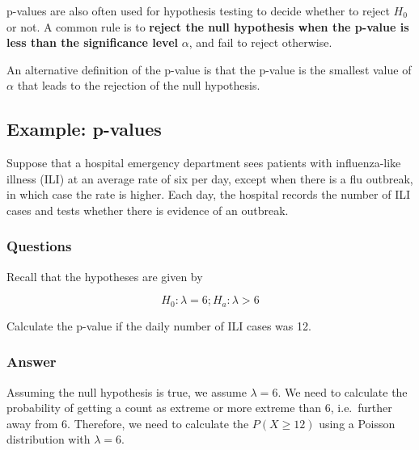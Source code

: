 \documentclass[
  letterpaper,
  DIV=11,
  numbers=noendperiod]{scrartcl}
\begin{document}
\begin{tcolorbox}[enhanced jigsaw, bottomtitle=1mm, colback=white, opacityback=0, leftrule=.75mm, opacitybacktitle=0.6, coltitle=black, left=2mm, colframe=quarto-callout-important-color-frame, toptitle=1mm, colbacktitle=quarto-callout-important-color!10!white, titlerule=0mm, title=\textcolor{quarto-callout-important-color}{\faExclamation}\hspace{0.5em}{Important}, arc=.35mm, rightrule=.15mm, breakable, bottomrule=.15mm, toprule=.15mm]

p-values are also often used for hypothesis testing to decide whether to
reject \(H_0\) or not. A common rule is to \textbf{reject the null
hypothesis when the p-value is less than the significance level}
\(\alpha\), and fail to reject otherwise.

An alternative definition of the p-value is that the p-value is the
smallest value of \(\alpha\) that leads to the rejection of the null
hypothesis.

\end{tcolorbox}

\subsection{Example: p-values}\label{example-p-values}

Suppose that a hospital emergency department sees patients with
influenza-like illness (ILI) at an average rate of six per day, except
when there is a flu outbreak, in which case the rate is higher. Each
day, the hospital records the number of ILI cases and tests whether
there is evidence of an outbreak.

\subsubsection{Questions}

Recall that the hypotheses are given by

\[
H_0: \lambda = 6; H_a: \lambda > 6
\]

Calculate the p-value if the daily number of ILI cases was 12.

\subsubsection{Answer}

Assuming the null hypothesis is true, we assume \(\lambda =6\). We need
to calculate the probability of getting a count as extreme or more
extreme than 6, i.e.~further away from 6. Therefore, we need to
calculate the \(P(X \geq 12)\) using a Poisson distribution with
\(\lambda=6\).
\end{document}
